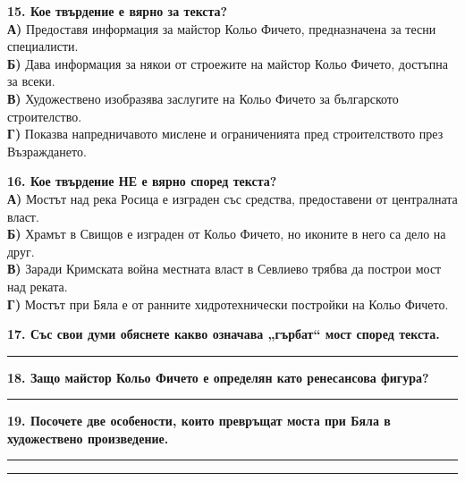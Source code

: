 \documentclass[12pt,a4paper]{article}
\begin{document}
\vspace{0.6cm}

\noindent
\textbf{15. Кое твърдение е вярно за текста?} \\
\textbf{А)} Предоставя информация за майстор Кольо Фичето, предназначена за тесни специалисти. \\
\textbf{Б)} Дава информация за някои от строежите на майстор Кольо Фичето, достъпна за всеки. \\
\textbf{В)} Художествено изобразява заслугите на Кольо Фичето за българското строителство. \\
\textbf{Г)} Показва напредничавото мислене и ограниченията пред строителството през Възраждането.

\vspace{0.6cm}

\noindent
\textbf{16. Кое твърдение НЕ е вярно според текста?} \\
\textbf{А)} Мостът над река Росица е изграден със средства, предоставени от централната власт. \\
\textbf{Б)} Храмът в Свищов е изграден от Кольо Фичето, но иконите в него са дело на друг. \\
\textbf{В)} Заради Кримската война местната власт в Севлиево трябва да построи мост над реката. \\
\textbf{Г)} Мостът при Бяла е от ранните хидротехнически постройки на Кольо Фичето.

\vspace{0.6cm}

\noindent
\textbf{17. Със свои думи обяснете какво означава „гърбат“ мост според текста.}

\vspace{0.2cm}
\noindent\rule{\linewidth}{0.4pt}

\vspace{0.6cm}

\noindent
\textbf{18. Защо майстор Кольо Фичето е определян като ренесансова фигура?}

\vspace{0.2cm}
\noindent\rule{\linewidth}{0.4pt}

\vspace{0.6cm}

\noindent
\textbf{19. Посочете две особености, които превръщат моста при Бяла в художествено произведение.}
\vspace{0.2cm}

\noindent\rule{\linewidth}{0.4pt}
\noindent\rule{\linewidth}{0.4pt}
\end{document}
